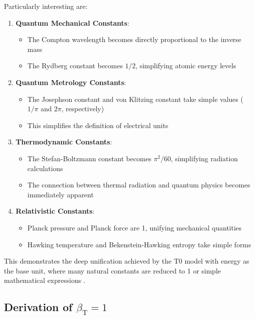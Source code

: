 \documentclass[12pt,a4paper]{article}
\newcommand{\betaT}{\beta_{\text{T}}}
\begin{document}
	Particularly interesting are:
	
	\begin{enumerate}
		\item \textbf{Quantum Mechanical Constants}:
		\begin{itemize}
			\item The Compton wavelength becomes directly proportional to the inverse mass
			\item The Rydberg constant becomes $1/2$, simplifying atomic energy levels
		\end{itemize}
		
		\item \textbf{Quantum Metrology Constants}:
		\begin{itemize}
			\item The Josephson constant and von Klitzing constant take simple values ($1/\pi$ and $2\pi$, respectively)
			\item This simplifies the definition of electrical units
		\end{itemize}
		
		\item \textbf{Thermodynamic Constants}:
		\begin{itemize}
			\item The Stefan-Boltzmann constant becomes $\pi^2/60$, simplifying radiation calculations
			\item The connection between thermal radiation and quantum physics becomes immediately apparent
		\end{itemize}
		
		\item \textbf{Relativistic Constants}:
		\begin{itemize}
			\item Planck pressure and Planck force are 1, unifying mechanical quantities
			\item Hawking temperature and Bekenstein-Hawking entropy take simple forms
		\end{itemize}
	\end{enumerate}
	
	This demonstrates the deep unification achieved by the T0 model with energy as the base unit, where many natural constants are reduced to 1 or simple mathematical expressions \cite{pascher_params_2025}.
	
	\subsection{Derivation of $\betaT = 1$}
	
\end{document}

